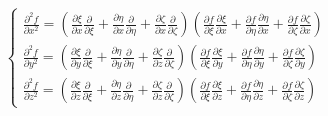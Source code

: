 \documentclass
[
a4paper,                      %
twoside,					  %
12pt,                         %
abstract,		      %
fleqn,                        %
]
{scrartcl} %
\begin{document}
\begin{equation}
\begin{cases}
\frac{\partial^{2} f}{\partial x^{2}}=\left(\frac{\partial\xi}{\partial x}\frac{\partial}{\partial\xi}+\frac{\partial\eta}{\partial x}\frac{\partial}{\partial\eta}+\frac{\partial\zeta}{\partial x}\frac{\partial}{\partial\zeta}\right)\left(\frac{\partial f}{\partial\xi}\frac{\partial\xi}{\partial x}+\frac{\partial f}{\partial\eta}\frac{\partial\eta}{\partial x}+\frac{\partial f}{\partial\zeta}\frac{\partial\zeta}{\partial x}\right)\\[5pt]
\frac{\partial^{2} f}{\partial y^{2}}=\left(\frac{\partial\xi}{\partial y}\frac{\partial}{\partial\xi}+\frac{\partial\eta}{\partial y}\frac{\partial}{\partial\eta}+\frac{\partial\zeta}{\partial z}\frac{\partial}{\partial\zeta}\right)\left(\frac{\partial f}{\partial\xi}\frac{\partial\xi}{\partial y}+\frac{\partial f}{\partial\eta}\frac{\partial\eta}{\partial y}+\frac{\partial f}{\partial\zeta}\frac{\partial\zeta}{\partial y}\right)\\[5pt]
\frac{\partial^{2} f}{\partial z^{2}}=\left(\frac{\partial\xi}{\partial z}\frac{\partial}{\partial\xi}+\frac{\partial\eta}{\partial z}\frac{\partial}{\partial\eta}+\frac{\partial\zeta}{\partial z}\frac{\partial}{\partial\zeta}\right)\left(\frac{\partial f}{\partial\xi}\frac{\partial\xi}{\partial z}+\frac{\partial f}{\partial\eta}\frac{\partial\eta}{\partial z}+\frac{\partial f}{\partial\zeta}\frac{\partial\zeta}{\partial z}\right)
\end{cases}
\end{equation}
\end{document}
